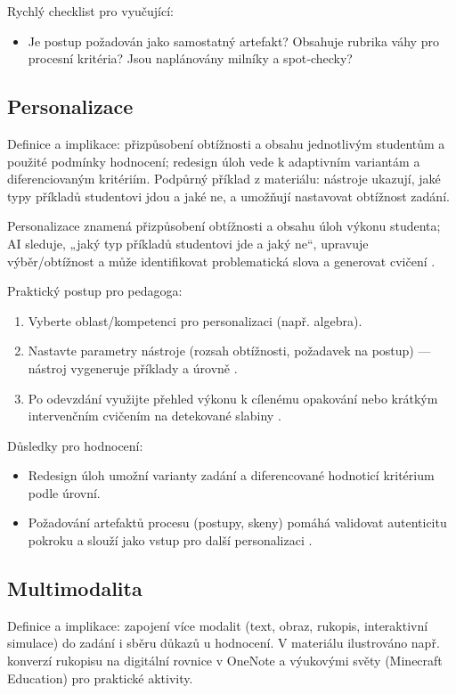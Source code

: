\documentclass{report}%
\begin{document}
Rychlý checklist pro vyučující:
\begin{itemize}
  \item Je postup požadován jako samostatný artefakt? Obsahuje rubrika váhy pro procesní kritéria? Jsou naplánovány milníky a spot‑checky?
\end{itemize}%

%
\subsection{Personalizace}%
Definice a implikace: přizpůsobení obtížnosti a obsahu jednotlivým studentům a použité podmínky hodnocení; redesign úloh vede k adaptivním variantám a diferenciovaným kritériím. Podpůrný příklad z materiálu: nástroje ukazují, jaké typy příkladů studentovi jdou a jaké ne, a umožňují nastavovat obtížnost zadání.%


%
Personalizace znamená přizpůsobení obtížnosti a obsahu úloh výkonu studenta; AI sleduje, „jaký typ příkladů studentovi jde a jaký ne“, upravuje výběr/obtížnost a může identifikovat problematická slova a generovat cvičení \cite{kb_ai_101_tipu_pdf_04e4a115_page_8_1, kb_ai_101_tipu_pdf_04e4a115_page_7_1}.

Praktický postup pro pedagoga: \begin{enumerate}
\item Vyberte oblast/kompetenci pro personalizaci (např. algebra).
\item Nastavte parametry nástroje (rozsah obtížnosti, požadavek na postup) — nástroj vygeneruje příklady a úrovně \cite{kb_ai_101_tipu_pdf_04e4a115_page_8_1}.
\item Po odevzdání využijte přehled výkonu k cílenému opakování nebo krátkým intervenčním cvičením na detekované slabiny \cite{kb_ai_101_tipu_pdf_04e4a115_page_7_1}.
\end{enumerate}

Důsledky pro hodnocení: \begin{itemize}
\item Redesign úloh umožní varianty zadání a diferencované hodnoticí kritérium podle úrovní.
\item Požadování artefaktů procesu (postupy, skeny) pomáhá validovat autenticitu pokroku a slouží jako vstup pro další personalizaci \cite{kb_ai_101_tipu_pdf_04e4a115_page_8_1}.
\end{itemize}%

%
\subsection{Multimodalita}%
Definice a implikace: zapojení více modalit (text, obraz, rukopis, interaktivní simulace) do zadání i sběru důkazů u hodnocení. V materiálu ilustrováno např. konverzí rukopisu na digitální rovnice v OneNote a výukovými světy (Minecraft Education) pro praktické aktivity.%
\end{document}
